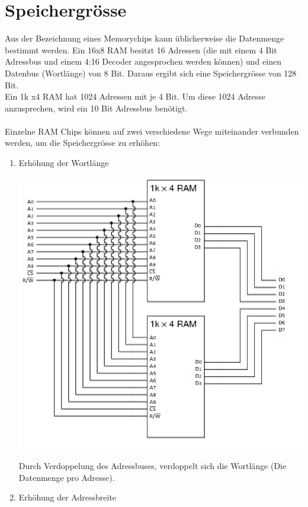 \documentclass[a4paper,10pt]{report}
\begin{document}
\section{Speichergrösse}
Aus der Bezeichnung eines Memorychips kann üblicherweise die Datenmenge bestimmt werden.
Ein 16x8 RAM besitzt 16 Adressen (die mit einem 4 Bit Adressbus und einem 4:16 Decoder angesprochen werden können) und einen Datenbus (Wortlänge) von 8 Bit. Daraus ergibt sich eine Speichergrösse von 128 Bit.\\
Ein 1k x4 RAM hat 1024 Adressen mit je 4 Bit. Um diese 1024 Adresse anzusprechen, wird ein 10 Bit Adressbus benötigt.\\ \\
Einzelne RAM Chips können auf zwei verschiedene Wege miteinander verbunden werden, um die Speichergrösse zu erhöhen:
\begin{enumerate}
	\item Erhöhung der Wortlänge 
	\begin{center}
\includegraphics[scale=0.75]{imgs/MemoryArray2.png}
\end{center}
Durch Verdoppelung des Adressbuses, verdoppelt sich die Wortlänge (Die Datenmenge pro Adresse). 
\item Erhöhung der Adressbreite
	\begin{center}

\end{center}
\end{enumerate}
\end{document}
